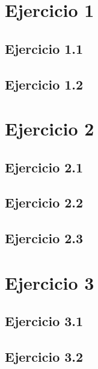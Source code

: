 \documentclass{aitemplate}
\begin{document}

\section*{Ejercicio 1}
\subsection*{Ejercicio 1.1}

%
\newpage
\subsection*{Ejercicio 1.2}

%
%
%
\newpage

\section*{Ejercicio 2}
\subsection*{Ejercicio 2.1}

%
\newpage
\subsection*{Ejercicio 2.2}

\newpage
\subsection*{Ejercicio 2.3}

\newpage

\section*{Ejercicio 3}
\subsection*{Ejercicio 3.1}

\newpage
\subsection*{Ejercicio 3.2}

\newpage
\end{document}
